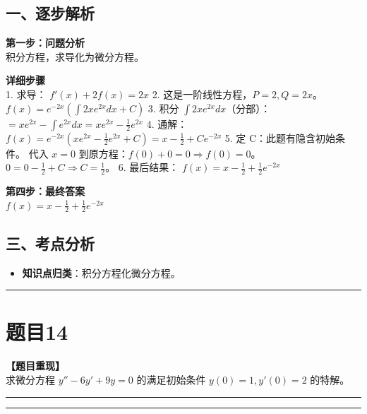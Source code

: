 \documentclass[12pt, a4paper]{ctexart}
\newcommand{\TopSeparator}{
    \par\noindent\rule{\textwidth}{1.5pt}\vspace{0.5em} %
}
\newcommand{\AnalysisSeparator}{
    \par\noindent\rule{\textwidth}{0.5pt}\vspace{0.2em}\hrule\vspace{0.5em} %
}
\newenvironment{RedAnalysis}{
    \par
    \color{red} %
}{
    \par
    \color{black} %
}
\begin{document}
\begin{RedAnalysis}

\subsection*{一、逐步解析}

\textbf{第一步：问题分析} \\
积分方程，求导化为微分方程。

\textbf{详细步骤} \\
1. 求导：
   $f'(x) + 2f(x) = 2x$
2. 这是一阶线性方程，$P=2, Q=2x$。
   $f(x) = e^{-2x} (\int 2x e^{2x} dx + C)$
3. 积分 $\int 2x e^{2x} dx$（分部）：
   $= x e^{2x} - \int e^{2x} dx = x e^{2x} - \frac{1}{2}e^{2x}$
4. 通解：
   $f(x) = e^{-2x} (xe^{2x} - \frac{1}{2}e^{2x} + C) = x - \frac{1}{2} + Ce^{-2x}$
5. 定 C：此题有隐含初始条件。
   代入 $x=0$ 到原方程：$f(0) + 0 = 0 \Rightarrow f(0)=0$。
   $0 = 0 - \frac{1}{2} + C \Rightarrow C = \frac{1}{2}$。
6. 最后结果：
   $f(x) = x - \frac{1}{2} + \frac{1}{2}e^{-2x}$

\textbf{第四步：最终答案} \\
$ f(x) = x - \frac{1}{2} + \frac{1}{2}e^{-2x} $

\subsection*{三、考点分析}
\begin{itemize}
    \item \textbf{知识点归类}：积分方程化微分方程。
\end{itemize}

\end{RedAnalysis}

\vspace{2em}

\TopSeparator
\section*{题目14}

\textbf{【题目重现】} \\
求微分方程 $ y'' - 6y' + 9y = 0 $ 的满足初始条件 $ y(0) = 1, y'(0) = 2 $ 的特解。

\AnalysisSeparator
\end{document}
